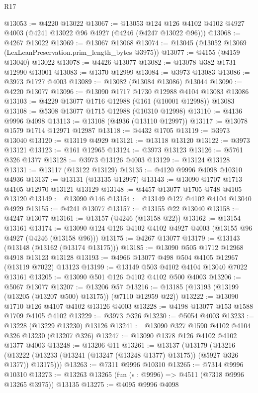 \begin{lexlean}{R17}
\begin{coremodule}
@13053 := @4220 @13022
@13067 := @13053
    @124
    @126
    @4102
    @4102
    @4927
    @4003
    (@4241 @13022 @96 @4927 (@4246 (@4247 @13022 @96)))
@13068 := @4267 @13022
@13069 := @13067 @13068
@13074 := @13045 (@13052 @13069 (LexLeanPreservation.prim_length_bytes @3975))
@13077 := @4155 (@4159 @13040) @13022
@13078 := @4426 @13077
@13082 := @13078 @382 @1731 @12990 @13001
@13083 := @1370 @12999
@13084 := @3973 @13083
@13086 := @3973 @1727 @4003
@13089 := @13082 (@13084 @13086) @13044
@13090 := @4220 @13077
@13096 := @13090 @1717 @1730 @12988 @4104 @13083 @13086
@13103 := @4229 @13077 @1716 @12988 (@161 (@10001 @12998)) @13083
@13108 := @5308 @13077 @1715 @12988 (@10310 @12998)
@13110 := @4136 @9996 @4098
@13113 := @13108 (@4936 (@13110 @12997))
@13117 := @13078 @1579 @1714 @12971 @12987
@13118 := @4432 @1705
@13119 := @3973 @13040
@13120 := @13119 @4929
@13121 := @13118 @13120
@13122 := @3973 @13121
@13123 := @161 @12965
@13124 := @3973 @13123
@13126 := @5761 @326 @1377
@13128 := @3973 @13126 @4003
@13129 := @13124 @13128
@13131 := @13117 (@13122 @13129)
@13135 := @4120 @9996 @4098 @10310 @4936
@13137 := @13131 (@13135 @12997)
@13143 := @13090 @1707 @1713 @4105 @12970 @13121 @13129
@13148 := @4457 @13077 @1705 @748 @4105 @13120
@13149 := @13090 @146
@13154 := @13149 @127 @4102 @4104 @13040 @4929
@13155 := @4241 @13077
@13157 := @13155 @22 @13040
@13158 := @4247 @13077
@13161 := @13157 (@4246 (@13158 @22))
@13162 := @13154 @13161
@13174 := @13090 @124 @126 @4102 @4102 @4927 @4003 (@13155 @96 @4927 (@4246 (@13158 @96)))
@13175 := @4267 @13077
@13179 := @13143 (@13148 (@13162 (@13174 @13175)))
@13185 := @13090 @505 @1712 @12968 @4918 @13123 @13128
@13193 := @4966 @13077 @498 @504 @4105 @12967 (@13119 @7022) @13123
@13199 := @13149 @503 @4102 @4104 @13040 @7022 @13161
@13205 := @13090 @501 @126 @4102 @4102 @500 @4003
@13206 := @5067 @13077
@13207 := @13206 @57
@13216 := @13185 (@13193 (@13199 (@13205 (@13207 @500) @13175)) (@7110 @12959 @22))
@13222 := @13090 @1710 @126 @4107 @4102 @13126 @4003
@13228 := @4198 @13077 @153 @1588 @1709 @4105 @4102
@13229 := @3973 @326
@13230 := @5054 @4003
@13233 := @13228 (@13229 @13230) @13126
@13241 := @13090 @327 @1590 @4102 @4104 @326 @13230 (@13207 @326)
@13247 := @13090 @1378 @126 @4102 @4102 @1377 @4003
@13248 := @13206 @11
@13261 := @13137
    (@13179
      (@13216 (@13222 (@13233 (@13241 (@13247 (@13248 @1377) @13175)) (@5927 @326 @1377)) @13175)))
@13263 := @7311 @9996 @10310
@13265 := @7314 @9996 @10310
@13273 := @13263 @13265 (fun (s : @9996) => @4511 (@7318 @9996 @13265 @3975)) @13135
@13275 := @4095 @9996 @4098

\end{coremodule}
\end{lexlean}
